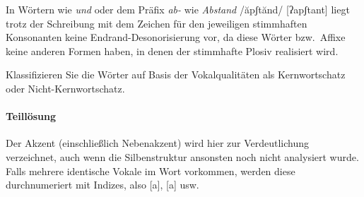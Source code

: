 In Wörtern wie \textit{und} oder dem Präfix \textit{ab-} wie \textit{Abstand} /ăpʃtănd/ [ʔapʃtant] liegt trotz der Schreibung mit dem Zeichen für den jeweiligen stimmhaften Konsonanten keine Endrand-Desonorisierung vor, da diese Wörter bzw.\ Affixe keine anderen Formen haben, in denen der stimmhafte Plosiv realisiert wird.


Klassifizieren Sie die Wörter auf Basis der Vokalqualitäten als Kernwortschatz oder Nicht-Kernwortschatz.

\paragraph*{Teillösung}

Der Akzent (einschließlich Nebenakzent) wird hier zur Verdeutlichung verzeichnet, auch wenn die Silbenstruktur ansonsten noch nicht analysiert wurde.
Falls mehrere identische Vokale im Wort vorkommen, werden diese durchnumeriert mit Indizes, also [a], [a] usw.

